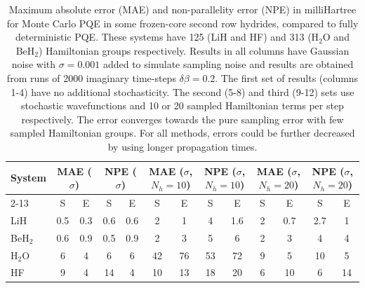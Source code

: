 \documentclass[%
 reprint,
 amsmath,amssymb,
 aps,
]{revtex4-2}
\begin{document}
\begin{table}
    \centering
    \begin{tabular}{l||c|c|c|c||c|c|c|c||c|c|c|c}
      \multirow{2}{*}{System} &  \multicolumn{2}{c|}{MAE ($\sigma$)} & \multicolumn{2}{c||}{NPE ($\sigma$)} & \multicolumn{2}{c|}{MAE ($\sigma$, $N_h = 10$)} & \multicolumn{2}{c||}{NPE ($\sigma$, $N_h = 10$)} & \multicolumn{2}{c|}{MAE ($\sigma$, $N_h = 20$)} &\multicolumn{2}{c}{NPE ($\sigma$, $N_h = 20$)}\\
      \cline{2-13}
      & S & E& S & E& S & E& S & E& S & E& S & E\\
      \hline
        LiH & 0.5 & 0.3 & 0.6 & 0.6 & \hspace*{5mm}2\hspace*{5mm} & 1& \hspace*{5mm}4\hspace*{5mm} &1.6&\hspace*{5mm}2\hspace*{5mm} &0.7 &\hspace*{4mm}2.7\hspace*{4mm}&1\\
         BeH$_2$ & 0.6 & 0.9 & 0.5 & 0.9 & 2 & 3 & 5 & 6 &2&3&4&4 \\
         H$_2$O & 6 & 4 & 6& 6& 42 &76 & 53& 72&9&5& 10& 5 \\
         HF& 9 & 4& 14 & 4 & 10& 13& 18 & 20 & 6 & 10 & 6 &14\\
         \hline
    \end{tabular}
    \caption{\small \justifying Maximum absolute error (MAE) and non-parallelity error (NPE) in milliHartree for Monte Carlo PQE in some frozen-core second row hydrides, compared to fully deterministic PQE. These systems have 125 (LiH and HF) and 313 (H$_2$O and BeH$_2$) Hamiltonian groups respectively. Results in all columns have Gaussian noise with $\sigma = 0.001$ added to simulate sampling noise and results are obtained from runs of 2000 imaginary time-steps $\delta \beta = 0.2$. The first set of results (columns 1-4) have no additional stochasticity. The second (5-8) and third (9-12) sets use stochastic wavefunctions and 10 or 20 sampled Hamiltonian terms per step respectively. The error converges towards the pure sampling error with few sampled Hamiltonian groups. For all methods, errors could be further decreased by using longer propagation times.}
    \label{tab:hydrides}
\end{table}
\end{document}

